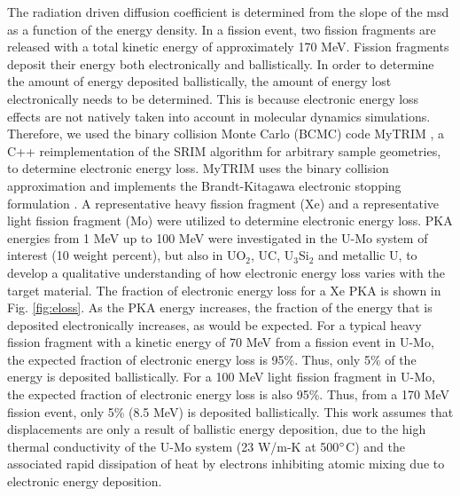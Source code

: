 \documentclass[review]{elsarticle}
\begin{document}
The radiation driven diffusion coefficient is determined from the slope of the msd as a function of the energy density. In a fission event, two fission fragments are released with a total kinetic energy of approximately 170 MeV. Fission fragments deposit their energy both electronically and ballistically. In order to determine the amount of energy deposited ballistically, the amount of energy lost electronically needs to be determined. This is because electronic energy loss effects are not natively taken into account in molecular dynamics simulations. Therefore, we used the binary collision Monte Carlo (BCMC) code MyTRIM \cite{myTRIM}, a C++ reimplementation of the SRIM algorithm for arbitrary sample geometries, to determine electronic energy loss. MyTRIM uses the binary collision approximation and implements the Brandt-Kitagawa electronic stopping formulation \cite{brandt1982}. A representative heavy fission fragment (Xe) and a representative light fission fragment (Mo) were utilized to determine electronic energy loss. PKA energies from 1 MeV up to 100 MeV were investigated in the U-Mo system of interest (10 weight percent), but also in UO$_2$, UC, U$_3$Si$_2$ and metallic U, to develop a qualitative understanding of how electronic energy loss varies with the target material. The fraction of electronic energy loss for a Xe PKA is shown in Fig. \ref{fig:eloss}. As the PKA energy increases, the fraction of the energy that is deposited electronically increases, as would be expected. For a typical heavy fission fragment with a kinetic energy of 70 MeV from a fission event in U-Mo, the expected fraction of electronic energy loss is 95\%. Thus, only 5\% of the energy is deposited ballistically. For a 100 MeV light fission fragment in U-Mo, the expected fraction of electronic energy loss is also 95\%. Thus, from a 170 MeV fission event, only 5\% (8.5 MeV) is deposited ballistically. This work assumes that displacements are only a result of ballistic energy deposition, due to the high thermal conductivity of the U-Mo system (23 W/m-K at 500$\degree$C) \cite{umo_handbook} and the associated rapid dissipation of heat by electrons inhibiting atomic mixing due to electronic energy deposition. 
\end{document}
